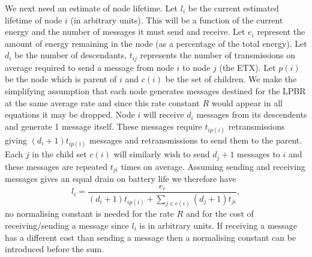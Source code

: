
We next need an estimate of node lifetime.  Let $l_i$ be the current estimated lifetime of node $i$ (in arbitrary units).  This will be a function of the current energy and the number of messages it must send and receive.  Let $e_i$ represent the amount of energy remaining in the node (as a percentage of the total energy).  Let $d_i$ be the number of descendants, $t_{ij}$ represents the number of transmissions on average required to send a message from node $i$ to node $j$ (the ETX).  Let $p(i)$ be the node which is parent of $i$ and $c(i)$ be the set of children.  
We make the simplifying assumption that each node generates messages destined for the LPBR at the same average rate and since this rate constant $R$ would appear in all equations it may be dropped.  Node $i$ will receive $d_i$ messages from its descendents and generate 1 message itself. These messages require $t_{ip(i)}$ retransmissions giving $(d_i + 1)t_{ip(i)}$ messages and retransmissions to send them to the parent.  Each $j$ in the child set $c(i)$ will similarly wish to send $d_j + 1$ messages to $i$ and these messages are repeated $t_{ji}$ times on average.  Assuming sending and receiving messages gives an equal drain on battery life we therefore have
\begin{equation}
l_i = \frac{e_i}{{(d_i + 1)t_{ip(i)} + \sum_{j \in c(i)} (d_j + 1)t_{ji}}},
\label{optimalEq}
\end{equation}
no normalising constant is needed for the rate $R$ and for the cost of receiving/sending a message since $l_i$ is in arbitrary units.  If receiving a message has a different cost than sending a message then a normalising constant can be introduced before the sum.

